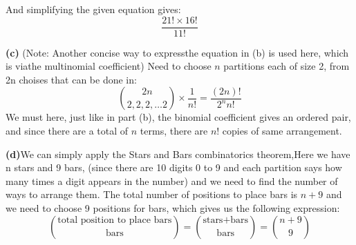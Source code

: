 \documentclass{article}
\begin{document}
And simplifying the given equation gives:
\[\frac{21! \times 16!}{11!}\]


\vspace{\baselineskip}
\noindent\textbf{(c)} (Note: Another concise way to expressthe  equation in (b) is used here, which is viathe  multinomial coefficient)
Need to choose $ n$ partitions each of size 2, from 2n choises that can be done in:
\[\binom{2n}{2,2,2,\dots 2} \times \frac{1}{n!} = \frac{(2n)!}{2^n n!}\] We must here, just like in part (b), the binomial coefficient gives an ordered pair, and since there are a total of $ n$ terms, there are $ n! $ copies of
same arrangement.

\vspace{\baselineskip}
\noindent\textbf{(d)}We can simply apply the Stars and Bars combinatorics theorem,Here we have n stars and 9 bars,
(since there are 10 digits 0 to 9 and each partition says how many times a digit appears in the number) 
and we need to find the number of ways to arrange them. 
The total number of positions to place bars is $n + 9$ and we need to choose 9 positions for bars, which gives us the following expression:
\[ \binom{\text{total position to place bars}}{\text{bars}} = \binom{\text{stars+bars}}{\text{bars}} = \binom{n + 9}{9}\]
\end{document}
